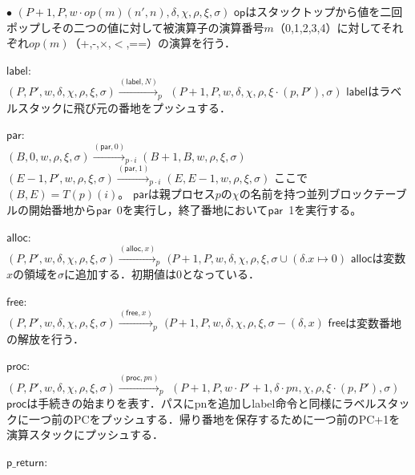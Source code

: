 \documentclass[submit,PRO]{ipsj}
\newcommand{\bcode}[1]{$\mathsf{#1}$}
\begin{document}
\begin{list}{$\bullet$}{}
\qquad $(P+1,P,w\cdot op(m)(n',n),\delta,\chi,\rho,\xi,\sigma)$\newline
\bcode{op}はスタックトップから値を二回ポップしその二つの値に対して被演算子の演算番号$m$（0,1,2,3,4）に対してそれぞれ$op(m)$（+,-,$\times$,$<$,==）の演算を行う．
\item \bcode{label}:\\
$(P,P',w,\delta,\chi,\rho,\xi,\sigma)\xrightarrow{(\mathsf{label},N)}_p$\newline
\qquad$(P+1,P,w,\delta,\chi,\rho,\xi\cdot(p,P'),\sigma)$\newline
\bcode{label}はラベルスタックに飛び元の番地をプッシュする．
\item \bcode{par}:\\
$(B,0,w,\rho,\xi,\sigma)\xrightarrow{(\mathsf{par},0)}_{p\cdot i}(B+1,B,w,\rho,\xi,\sigma)$\newline
$(E-1,P',w,\rho,\xi,\sigma)\xrightarrow{(\mathsf{par},1)}_{p\cdot i}(E,E-1,w,\rho,\xi,\sigma)$\newline
ここで$(B,E)=T(p)(i)$。
\bcode{par}は親プロセス$p$の$\chi$の名前を持つ並列ブロックテーブルの開始番地から\bcode{par}\ 0を実行し，終了番地において\bcode{par}\ 1を実行する。
\item \bcode{alloc}:\\
$(P,P',w,\delta,\chi,\rho,\xi,\sigma)\xrightarrow{(\mathsf{alloc},x)}_p$\newline
\qquad $(P+1,P,w,\delta,\chi,\rho,\xi,\sigma\cup(\delta.x\mapsto 0)$\newline
\bcode{alloc}は変数$x$の領域を$\sigma$に追加する．初期値は0となっている．
\item \bcode{free}:\\
$(P,P',w,\delta,\chi,\rho,\xi,\sigma)\xrightarrow{(\mathsf{free},x)}_p$\newline
\qquad $(P+1,P,w,\delta,\chi,\rho,\xi,\sigma-(\delta,x)$\newline
\bcode{free}は変数番地の解放を行う．
\item \bcode{proc}:\\
$(P,P',w,\delta,\chi,\rho,\xi,\sigma)\xrightarrow{(\mathsf{proc},pn)}_p$\newline
\qquad $(P+1,P,w\cdot P'+1,\delta\cdot pn,\chi,\rho,\xi\cdot(p,P'),\sigma)$\newline
\bcode{proc}は手続きの始まりを表す．パスにpnを追加しlabel命令と同様にラベルスタックに一つ前のPCをプッシュする．帰り番地を保存するために一つ前のPC+1を演算スタックにプッシュする．
\item \bcode{p\_return}:\\

\end{list}
\end{document}
